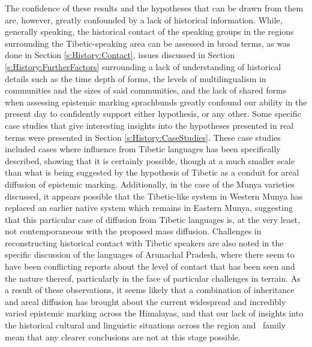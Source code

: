 The confidence of these results and the hypotheses that can be drawn from them are, however, greatly confounded by a lack of historical information. While, generally speaking, the historical contact of the speaking groups in the regions surrounding the Tibetic-speaking area can be assessed in broad terms, as was done in Section \ref{s:History:Contact}, issues discussed in Section \ref{s:History:FurtherFactors} surrounding a lack of understanding of historical details such as the time depth of forms, the levels of multilingualism in communities and the sizes of said communities, and the lack of shared forms when assessing epistemic marking sprachbunds greatly confound our ability in the present day to confidently support either hypothesis, or any other. Some specific case studies that give interesting insights into the hypotheses presented in real terms were presented in Section \ref{s:History:CaseStudies}. These case studies included cases where influence from Tibetic languages has been specifically described, showing that it is certainly possible, though at a much smaller scale than what is being suggested by the hypothesis of Tibetic as a conduit for areal diffusion of epistemic marking. Additionally, in the case of the Munya varieties discussed, it appears possible that the Tibetic-like system in Western Munya has replaced an earlier native system which remains in Eastern Munya, suggesting that this particular case of diffusion from Tibetic languages is, at the very least, not contemporaneous with the proposed mass diffusion. Challenges in reconstructing historical contact with Tibetic speakers are also noted in the specific discussion of the languages of Arunachal Pradesh, where there seem to have been conflicting reports about the level of contact that has been seen and the nature thereof, particularly in the face of particular challenges in terrain. As a result of these observations, it seems likely that a combination of inheritance and areal diffusion has brought about the current widespread and incredibly varied epistemic marking across the Himalayas, and that our lack of insights into the historical cultural and linguistic situations across the region and \lfam\ family mean that any clearer conclusions are not at this stage possible.